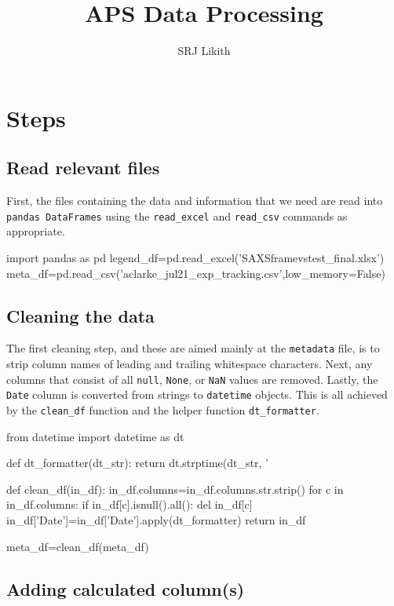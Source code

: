 \documentclass{article}
\title{APS Data Processing}
\author{SRJ Likith}
\date{}
\begin{document}
\maketitle

\section{Steps}

\subsection{Read relevant files}

First, the files containing the data and information that we need are read into \texttt{pandas DataFrames} using the \texttt{read\_excel} and \texttt{read\_csv} commands as appropriate.

\begin{pythoncode}
import pandas as pd
legend_df=pd.read_excel('SAXSframevstest_final.xlsx')
meta_df=pd.read_csv('aclarke_jul21_exp_tracking.csv',low_memory=False)
\end{pythoncode}


\subsection{Cleaning the data}

The first cleaning step, and these are aimed mainly at the \texttt{metadata} file, is to strip column names of leading and trailing whitespace characters. Next, any columns that consist of all \texttt{null}, \texttt{None}, or \texttt{NaN} values are removed. Lastly, the \texttt{Date} column is converted from strings to \texttt{datetime} objects. This is all achieved by the \texttt{clean\_df} function and the helper function \texttt{dt\_formatter}.

\begin{pythoncode}
from datetime import datetime as dt
  
def dt_formatter(dt_str):
    return dt.strptime(dt_str, '%

def clean_df(in_df):
    in_df.columns=in_df.columns.str.strip()
    for c in in_df.columns:
        if in_df[c].isnull().all():
            del in_df[c]
    in_df['Date']=in_df['Date'].apply(dt_formatter)
    return in_df

meta_df=clean_df(meta_df)
\end{pythoncode}

\newpage
\subsection{Adding calculated column(s)}
\end{document}
